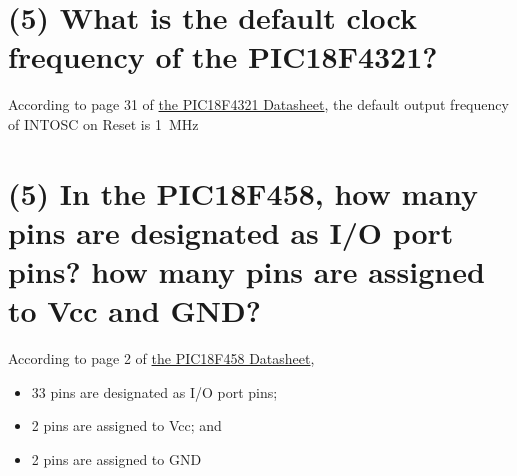 \documentclass{article}
\begin{document}
\newpage

\section{(5) What is the default clock frequency of the PIC18F4321?}
According to page 31 of \href{http://ww1.microchip.com/downloads/en/DeviceDoc/39689b.pdf}{the PIC18F4321 Datasheet}, the default output frequency of INTOSC on Reset is \SI{1}{\mega\hertz}

\newpage

\section{(5) In the PIC18F458, how many pins are designated as I/O port pins? how many pins are assigned to Vcc and GND?}
According to page 2 of \href{http://ww1.microchip.com/downloads/en/DeviceDoc/41159e.pdf}{the PIC18F458 Datasheet}, 
\begin{itemize}
  \item 33 pins are designated as I/O port pins; 
  \item 2 pins are assigned to Vcc; and 
  \item 2 pins are assigned to GND
\end{itemize}




\newpage
\end{document}
